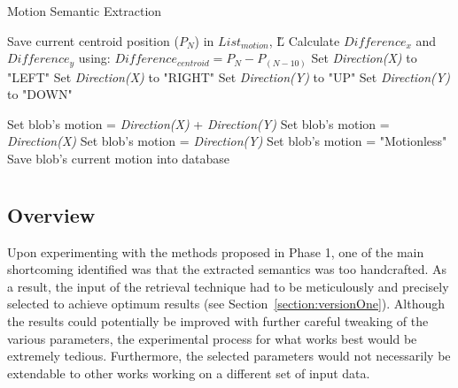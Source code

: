  \begin{algorithm}[H]
    \caption{Motion Semantic Extraction}
    \label{algo:motion}
    \begin{algorithmic}[1]
        \STATE Save current centroid position ($P_N$) in $List_{motion}$, \H{L}
        \STATE Calculate $Difference_x$ and $Difference_y$ using:
        \STATE $Difference_{centroid} = P_N -P_{(N-10)}$
        \STATE Set \textit{Direction(X)} to "LEFT"
        \ELSE
        \STATE Set \textit{Direction(X)} to "RIGHT"
        \ENDIF
        \ENDIF
        \STATE Set \textit{Direction(Y)} to "UP"
        \ELSE
        \STATE Set \textit{Direction(Y)} to "DOWN"
        \ENDIF
        \ENDIF

        \STATE Set blob's motion = \textit{Direction(X)} + \textit{Direction(Y)}
        \ELSE
        \STATE Set blob's motion = \textit{Direction(X) }
        \STATE Set blob's motion = \textit{Direction(Y)}
        \ELSE
        \STATE Set blob's motion = "Motionless"
        \ENDIF
        \ENDIF
        \ENDIF
        \STATE Save blob's current motion into database
        \ENDFOR
    \end{algorithmic}
\end{algorithm}



\section{\versionTwoExt}
\label{section:semantic_chamfer}

\subsection{Overview}

Upon experimenting with the methods proposed in Phase 1, one of the main shortcoming identified was that the extracted semantics was too handcrafted.
As a result, the input of the retrieval technique had to be meticulously and precisely selected to achieve optimum results (see Section~\ref{section:versionOne}).
Although the results could potentially be improved with further careful tweaking of the various parameters, the experimental process for what works best would be extremely tedious.
Furthermore, the selected parameters would not necessarily be extendable to other works working on a different set of input data.


